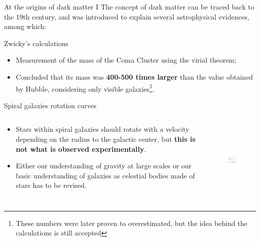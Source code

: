 \documentclass[8pt]{beamer}
\begin{document}
\begin{frame}{At the origins of dark matter I}
\justifying
The concept of dark matter can be traced back to the 19th century, and \alert{was introduced to explain several astrophysical evidences}, among which: \vfill

\vspace{10pt}	
\begin{block}{ \centering Zwicky's calculations}\end{block}

\begin{itemize}
\justifying
\item Measurement of the mass of the Coma Cluster using the virial theorem;
\item Concluded that its mass was \textbf{400-500 times larger} than the value obtained by Hubble, considering only visible galaxies\footnote[frame]{These numbers were later proven to overestimated, but the idea behind the calculations is still accepted}. %
\end{itemize} \vfill

\vspace{10pt}	
\begin{block}{ \centering Spiral galaxies rotation curves}\end{block}

\begin{columns}
	\begin{column}{0.65\textwidth}
\begin{itemize}
\justifying
\vspace{-5pt}	
\item Stars within spiral galaxies should rotate with a velocity depending on the radius to the galactic center, but \textbf{this is not what is observed experimentally}.%
\vspace{1pt}	
\item Either our understanding of gravity at large scales or our basic understanding of galaxies as celestial bodies made of stars has to be revised.
\end{itemize} 
\end{column}

\begin{column}{0.44\textwidth}
\begin{figure}[htbp]
\begin{center}
\includegraphics[width=4.5cm, height=3.7cm]{figs/RotationCurve.jpeg}
\end{center}
\end{figure}
\end{column}
\end{columns} \vfill

\end{frame}
\end{document}
